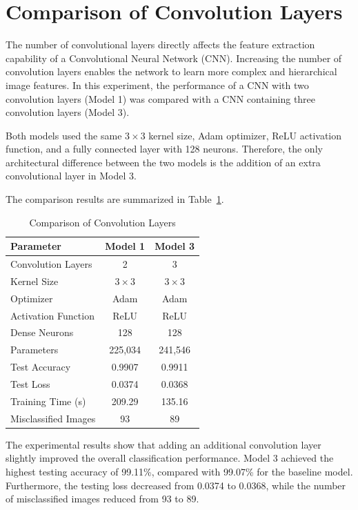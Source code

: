 
\section{Comparison of Convolution Layers}

The number of convolutional layers directly affects the feature extraction capability of a Convolutional Neural Network (CNN). Increasing the number of convolution layers enables the network to learn more complex and hierarchical image features. In this experiment, the performance of a CNN with two convolution layers (Model 1) was compared with a CNN containing three convolution layers (Model 3).

Both models used the same $3\times3$ kernel size, Adam optimizer, ReLU activation function, and a fully connected layer with 128 neurons. Therefore, the only architectural difference between the two models is the addition of an extra convolutional layer in Model 3.

The comparison results are summarized in Table~\ref{tab:convcomparison}.

\begin{table}[H]
\centering
\caption{Comparison of Convolution Layers}\label{tab:convcomparison}

\begin{tabular}{lcc}
\toprule
\textbf{Parameter} & \textbf{Model 1} & \textbf{Model 3} \\
\midrule
Convolution Layers & 2 & 3\\
Kernel Size & $3\times3$ & $3\times3$\\
Optimizer & Adam & Adam\\
Activation Function & ReLU & ReLU\\
Dense Neurons & 128 & 128\\
Parameters & 225,034 & 241,546\\
Test Accuracy & 0.9907 & 0.9911\\
Test Loss & 0.0374 & 0.0368\\
Training Time (s) & 209.29 & 135.16\\
Misclassified Images & 93 & 89\\
\bottomrule
\end{tabular}

\end{table}

The experimental results show that adding an additional convolution layer slightly improved the overall classification performance. Model 3 achieved the highest testing accuracy of 99.11\%, compared with 99.07\% for the baseline model. Furthermore, the testing loss decreased from 0.0374 to 0.0368, while the number of misclassified images reduced from 93 to 89.

